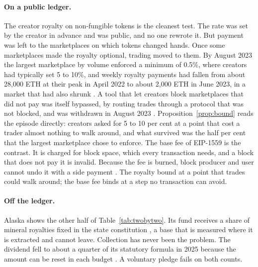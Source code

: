 \paragraph{On a public ledger.} The creator royalty on non-fungible tokens is the
cleanest test. The rate was set by the creator in advance and was public, and no one
rewrote it. But payment was left to the marketplaces on which tokens changed hands. Once some marketplaces made the royalty optional, trading
moved to them. By August 2023 the largest marketplace by volume enforced a minimum of
0.5\%, where creators had typically set 5 to 10\%, and weekly royalty payments had fallen
from about 28,000 ETH at their peak in April 2022 to about 2,000 ETH in June 2023, in a
market that had also shrunk \citep{Akers2023}. A tool that let creators block marketplaces that did not pay
was itself bypassed, by routing trades through a protocol that was not blocked, and was
withdrawn in August 2023 \citep{Lindrea2023}. Proposition~\ref{prop:bound} reads the
episode directly: creators asked for 5 to 10 per cent at a point that cost a trader almost
nothing to walk around, and what survived was the half per cent that the largest
marketplace chose to enforce. The base fee of EIP-1559 is the contrast.
It is charged for block space, which every transaction needs, and a block that does not
pay it is invalid. Because the fee is burned, block producer and user cannot undo it with
a side payment \citep{Roughgarden2021}. The royalty bound at a point that trades could
walk around; the base fee binds at a step no transaction can avoid.

\paragraph{Off the ledger.} Alaska shows the other half of Table~\ref{tab:twobytwo}. Its
fund receives a share of mineral royalties fixed in the state constitution
\citep{APFC2026}, a base that is measured where it is extracted and cannot leave. Collection has
never been the problem. The dividend fell to about a quarter of its statutory formula in
2025 because the amount can be reset in each budget
\citep{Wielechowski2017,AlaskaPublic2025}. A voluntary pledge \citep{OKeefe2020} fails on
both counts.

